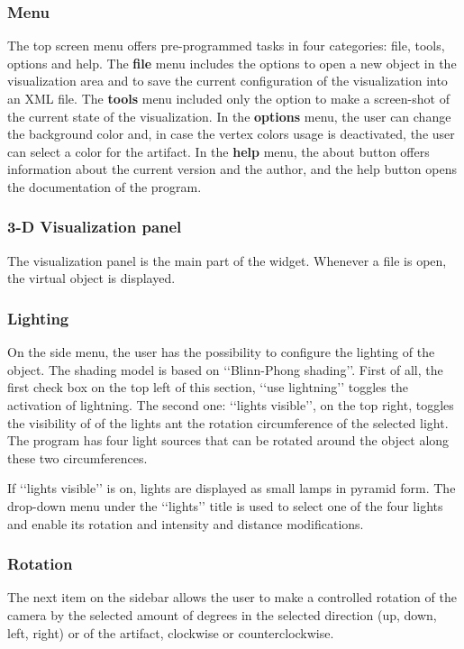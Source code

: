 \documentclass[12pt]{extarticle}
\begin{document}
	\subsubsection { Menu}
	The top screen menu offers pre-programmed tasks in four categories: file, tools, options and help.
	The \textbf{file} menu includes the options to open a new object in the visualization area and to save the current configuration of the visualization into an XML file.
	The \textbf{tools} menu included only the option to make a screen-shot of the current state of the visualization.
	In the \textbf{options} menu, the user can change the background color and, in case the vertex colors usage is deactivated, the user can select a color for the artifact.
	In the \textbf{help} menu, the about button offers information about the current version and the author, and the help button opens the documentation of the program.
	\subsubsection { 3-D Visualization panel}
	The visualization panel is the main part of the widget. Whenever a file is open, the virtual object is displayed.
	\subsubsection { Lighting}
	On the side menu, the user has the possibility to configure the lighting of the object. The shading model is based on \lq\lq{}Blinn-Phong shading\rq\rq{}. First of all, the first check box on the top left of this section, \lq\lq{}use lightning\rq\rq{} toggles the activation of lightning. The second one: \lq\lq{}lights visible\rq\rq{}, on the top right, toggles the visibility of of the lights ant the rotation circumference of the selected light. The program has four light sources that can be rotated around the object along these two circumferences. 
	
	If \lq\lq{}lights visible\rq\rq{} is on, lights are displayed as small lamps in pyramid form. The drop-down menu under the \lq\lq{}lights\rq\rq{} title is used to select one of the four lights and enable its rotation and intensity and distance modifications.
	\subsubsection { Rotation}
	The next item on the sidebar allows the user to make a controlled rotation of the camera by the selected amount of degrees in the selected direction (up, down, left, right) or of the artifact, clockwise or counterclockwise.
\end{document}
